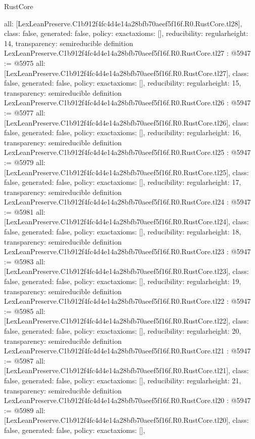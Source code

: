 \begin{lexlean}{RustCore}
\begin{coremodule}
{  all: [LexLeanPreserve.C1b912f4fc4d4e14a28bfb70aeef5f16f.R0.RustCore.tl28],
  class: false,
  generated: false,
  policy: exact{axioms: []},
  reducibility: regular{height: 14},
  transparency: semireducible
}
definition LexLeanPreserve.C1b912f4fc4d4e14a28bfb70aeef5f16f.R0.RustCore.tl27 : @5947 := @5975 {
  all: [LexLeanPreserve.C1b912f4fc4d4e14a28bfb70aeef5f16f.R0.RustCore.tl27],
  class: false,
  generated: false,
  policy: exact{axioms: []},
  reducibility: regular{height: 15},
  transparency: semireducible
}
definition LexLeanPreserve.C1b912f4fc4d4e14a28bfb70aeef5f16f.R0.RustCore.tl26 : @5947 := @5977 {
  all: [LexLeanPreserve.C1b912f4fc4d4e14a28bfb70aeef5f16f.R0.RustCore.tl26],
  class: false,
  generated: false,
  policy: exact{axioms: []},
  reducibility: regular{height: 16},
  transparency: semireducible
}
definition LexLeanPreserve.C1b912f4fc4d4e14a28bfb70aeef5f16f.R0.RustCore.tl25 : @5947 := @5979 {
  all: [LexLeanPreserve.C1b912f4fc4d4e14a28bfb70aeef5f16f.R0.RustCore.tl25],
  class: false,
  generated: false,
  policy: exact{axioms: []},
  reducibility: regular{height: 17},
  transparency: semireducible
}
definition LexLeanPreserve.C1b912f4fc4d4e14a28bfb70aeef5f16f.R0.RustCore.tl24 : @5947 := @5981 {
  all: [LexLeanPreserve.C1b912f4fc4d4e14a28bfb70aeef5f16f.R0.RustCore.tl24],
  class: false,
  generated: false,
  policy: exact{axioms: []},
  reducibility: regular{height: 18},
  transparency: semireducible
}
definition LexLeanPreserve.C1b912f4fc4d4e14a28bfb70aeef5f16f.R0.RustCore.tl23 : @5947 := @5983 {
  all: [LexLeanPreserve.C1b912f4fc4d4e14a28bfb70aeef5f16f.R0.RustCore.tl23],
  class: false,
  generated: false,
  policy: exact{axioms: []},
  reducibility: regular{height: 19},
  transparency: semireducible
}
definition LexLeanPreserve.C1b912f4fc4d4e14a28bfb70aeef5f16f.R0.RustCore.tl22 : @5947 := @5985 {
  all: [LexLeanPreserve.C1b912f4fc4d4e14a28bfb70aeef5f16f.R0.RustCore.tl22],
  class: false,
  generated: false,
  policy: exact{axioms: []},
  reducibility: regular{height: 20},
  transparency: semireducible
}
definition LexLeanPreserve.C1b912f4fc4d4e14a28bfb70aeef5f16f.R0.RustCore.tl21 : @5947 := @5987 {
  all: [LexLeanPreserve.C1b912f4fc4d4e14a28bfb70aeef5f16f.R0.RustCore.tl21],
  class: false,
  generated: false,
  policy: exact{axioms: []},
  reducibility: regular{height: 21},
  transparency: semireducible
}
definition LexLeanPreserve.C1b912f4fc4d4e14a28bfb70aeef5f16f.R0.RustCore.tl20 : @5947 := @5989 {
  all: [LexLeanPreserve.C1b912f4fc4d4e14a28bfb70aeef5f16f.R0.RustCore.tl20],
  class: false,
  generated: false,
  policy: exact{axioms: []},
}
\end{coremodule}
\end{lexlean}
